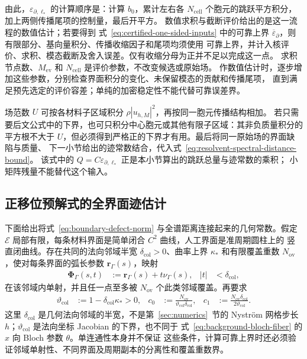 由此，$\varepsilon_{\partial,\ell_*}$ 的计算顺序是：计算 $b_0$，累计左右各
$N_{\mathrm{cell}}$ 个胞元的跳跃平方积分，加上两侧传播尾项的控制量，最后开平方。
数值求积与截断评价给出的是这一流程的数值估计；若要得到
式~\eqref{eq:certified-one-sided-inputs} 中的可靠上界
$\overline\varepsilon_\partial$，则有限部分、基向量积分、传播收缩因子和尾项均须使用
可靠上界，并计入核评价、求积、模态截断及舍入误差。仅有收缩分母为正并不足以完成这一点。
求积节点数、$M_{\mathrm{ev}}$ 和 $N_{\mathrm{cell}}$ 是评价参数，不改变候选或原始场。
作数值估计时，逐步增加这些参数，分别检查界面积分的变化、未保留模态的贡献和传播尾项，
直到满足预先选定的评价容差；单纯的加密稳定性不能代替可靠误差界。

场范数 $U$ 可按各材料子区域积分 $\rho|u_{h,M}|^2$，再按同一胞元传播结构相加。
若只需要后文公式中的下界，也可只积分中心胞元或其他有限子区域：其非负质量积分的
平方根不大于 $U$，但必须得到严格正的下界才有用。最后将同一原始场的界面缺陷与质量、
下一小节给出的迹常数结合，代入式~\eqref{eq:resolvent-spectral-distance-bound}。
该式中的 $Q=C\varepsilon_{\partial,\ell_*}$ 正是本小节算出的跳跃总量与迹常数的乘积；
小矩阵残量不能替代这个输入。

\subsection{正移位预解式的全界面迹估计}

下面给出将式~\eqref{eq:boundary-defect-norm} 与全谱距离连接起来的几何常数。假定
$\mathscr E$ 局部有限，每条材料界面是简单闭合 $C^2$ 曲线，人工界面是准周期圆柱上的
竖直闭曲线。存在共同的法向邻域半宽 $\delta_{\mathrm{col}}>0$、曲率上界
$\kappa_*$ 和有限覆盖重数 $N_{\mathrm{ov}}$，使对每条界面的弧长参数
$\boldsymbol r_\Gamma(s)$，映射
\begin{align}
  \boldsymbol\Phi_\Gamma(s,t)
  &:=\boldsymbol r_\Gamma(s)+t\nu_\Gamma(s),
  &|t|&<\delta_{\mathrm{col}},
  \label{eq:interface-normal-neighborhood}
\end{align}
在该邻域内单射，并且任一点至多被 $N_{\mathrm{ov}}$ 个此类邻域覆盖。再要求
\begin{align}
  \vartheta_{\mathrm{col}}
  &:=1-\delta_{\mathrm{col}}\kappa_*>0,
  &c_0&:=\frac{N_{\mathrm{ov}}}
    {\vartheta_{\mathrm{col}}\delta_{\mathrm{col}}},
  &c_1&:=\frac{N_{\mathrm{ov}}\delta_{\mathrm{col}}}
    {2\vartheta_{\mathrm{col}}}.
  \label{eq:trace-geometry-constants}
\end{align}
这里 $\delta_{\mathrm{col}}$ 是几何法向邻域的半宽，不是第~\ref{sec:numerics}~节的
Nystr\"om 网格步长 $h$；$\vartheta_{\mathrm{col}}$ 是法向坐标 Jacobian 的下界，也不同于
式~\eqref{eq:background-bloch-fiber} 的 $x$ 向 Bloch 参数 $\theta$。单连通性本身并不保证
这些条件，计算可靠上界时还必须验证邻域单射性、不同界面及周期副本的分离性和覆盖重数界。

